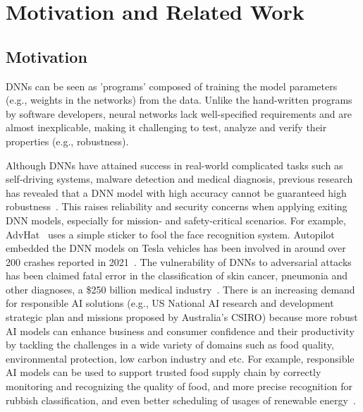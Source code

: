 \section{Motivation and Related Work}\label{back}

\subsection{Motivation}

DNNs can be seen as 'programs' composed of training the model parameters (e.g., weights in the networks) from the data. Unlike the hand-written programs by software developers, neural networks lack well-specified requirements and are almost inexplicable, making it challenging to test, analyze and verify their properties (e.g., robustness).

Although DNNs have attained success in real-world complicated tasks such as self-driving systems, malware detection and medical diagnosis, previous research has revealed that a DNN model with high accuracy cannot be guaranteed high  robustness~\cite{ICSE2020W_B_Fairness_Test_Adversarial_Sampling,juuti2019prada,shi2020adaptive,tsipras2018robustness}. This raises reliability and security concerns when applying 
exiting DNN models, especially for mission- and safety-critical scenarios. For example, AdvHat~\cite{AdvHat} uses a simple sticker to fool the face recognition system. Autopilot embedded the DNN models on Tesla vehicles has been involved in around over 200 crashes reported in  2021~\cite{wang2019security}. The vulnerability of DNNs to adversarial attacks has been claimed fatal error in the classification of skin cancer, pneumonia and other diagnoses, a \$250 billion medical industry~\cite{finlayson2019adversarial}. 
There is an increasing demand for responsible AI solutions (e.g., US National AI research and development strategic plan and missions proposed by Australia's CSIRO) because more robust AI models can enhance business and consumer confidence and their productivity by tackling the challenges in a wide variety of domains such as food quality, environmental protection, low carbon industry and etc. For example, responsible AI models can be used to support trusted food supply chain by correctly monitoring and recognizing the quality of food, and more precise recognition for rubbish classification, and even better scheduling of usages of renewable energy~\cite{csiromission}.


